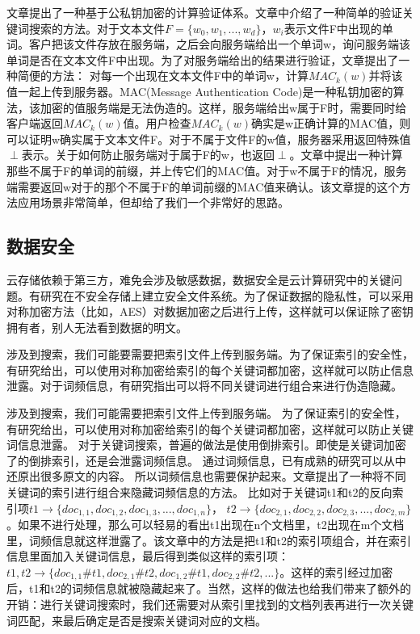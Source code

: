 文章\cite{benabbas2011verifiable}提出了一种基于公私钥加密的计算验证体系。文章中介绍了一种简单的验证关键词搜索的方法。对于文本文件$F = \{w_0,w_1,...,w_d\}$，$w_i$表示文件F中出现的单词。客户把该文件存放在服务端，之后会向服务端给出一个单词w，询问服务端该单词是否在文本文件F中出现。为了对服务端给出的结果进行验证，文章提出了一种简便的方法：
对每一个出现在文本文件F中的单词w，计算$MAC_k(w)$并将该值一起上传到服务器。MAC(Message Authentication Code)是一种私钥加密的算法，该加密的值服务端是无法伪造的。这样，服务端给出w属于F时，需要同时给客户端返回$MAC_k(w)$值。用户检查$MAC_k(w)$确实是w正确计算的MAC值，则可以证明w确实属于文本文件F。对于不属于文件F的w值，服务器采用返回特殊值$\perp$表示。关于如何防止服务端对于属于F的w，也返回$\perp$。文章中提出一种计算那些不属于F的单词的前缀，并上传它们的MAC值。对于w不属于F的情况，服务端需要返回w对于的那个不属于F的单词前缀的MAC值来确认。该文章提的这个方法应用场景非常简单，但却给了我们一个非常好的思路。

\subsection{数据安全}
云存储依赖于第三方，难免会涉及敏感数据，数据安全是云计算研究中的关键问题。有研究在不安全存储上建立安全文件系统。为了保证数据的隐私性，可以采用对称加密方法（比如，AES）对数据加密之后进行上传，这样就可以保证除了密钥拥有者，别人无法看到数据的明文。

涉及到搜索，我们可能要需要把索引文件上传到服务端。为了保证索引的安全性，有研究给出，可以使用对称加密给索引的每个关键词都加密，这样就可以防止信息泄露。对于词频信息，有研究指出可以将不同关键词进行组合来进行伪造隐藏。

涉及到搜索，我们可能需要把索引文件上传到服务端。
为了保证索引的安全性，有研究给出，可以使用对称加密给索引的每个关键词都加密，这样就可以防止关键词信息泄露。
对于关键词搜索，普遍的做法是使用倒排索引。即使是关键词加密了的倒排索引，还是会泄露词频信息。
通过词频信息，已有成熟的研究可以从中还原出很多原文的内容。
所以词频信息也需要保护起来。文章\cite{zerr2008zerber}提出了一种将不同关键词的索引进行组合来隐藏词频信息的方法。
比如对于关键词t1和t2的反向索引项$t1 \to \{doc_{1,1},doc_{1,2},doc_{1,3},...,doc_{1,n}\}$， $t2 \to \{doc_{2,1},doc_{2,2},doc_{2,3},...,doc_{2,m}\}$。如果不进行处理，那么可以轻易的看出t1出现在n个文档里，t2出现在m个文档里，词频信息就这样泄露了。该文章中的方法是把t1和t2的索引项组合，并在索引信息里面加入关键词信息，最后得到类似这样的索引项：$t1,t2 \to \{doc_{1,1}\#t1,doc_{2,1}\#t2,doc_{1,2}\#t1,doc_{2,2}\#t2,...\}$。这样的索引经过加密后，t1和t2的词频信息就被隐藏起来了。当然，这样的做法也给我们带来了额外的开销：进行关键词搜索时，我们还需要对从索引里找到的文档列表再进行一次关键词匹配，来最后确定是否是搜索关键词对应的文档。

